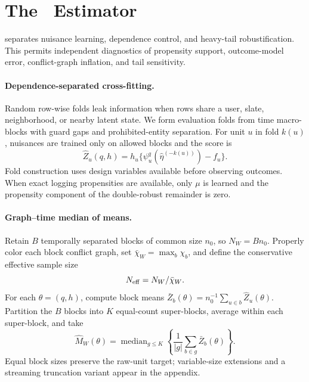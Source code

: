 \section{The \COMET\ Estimator}
\label{sec:method}

\COMET separates nuisance learning, dependence control, and heavy-tail robustification. This permits independent diagnostics of propensity support, outcome-model error, conflict-graph inflation, and tail sensitivity.

\paragraph{Dependence-separated cross-fitting.}
Random row-wise folds leak information when rows share a user, slate, neighborhood, or nearby latent state. We form evaluation folds from time macro-blocks with guard gaps and prohibited-entity separation. For unit $u$ in fold $k(u)$, nuisances are trained only on allowed blocks and the score is
\begin{equation}
\widehat Z_u(q,h)=h_u\{\psi_u^q(\widehat\eta^{(-k(u))})-f_u\}.
\label{eq:crossfit-score}
\end{equation}
Fold construction uses design variables available before observing outcomes. When exact logging propensities are available, only $\mu$ is learned and the propensity component of the double-robust remainder is zero.

\paragraph{Graph--time median of means.}
Retain $B$ temporally separated blocks of common size $n_0$, so $N_W=Bn_0$. Properly color each block conflict graph, set $\bar\chi_W=\max_b\chi_b$, and define the conservative effective sample size
\begin{equation}
N_{\mathrm{eff}}=N_W/\bar\chi_W.
\label{eq:neff}
\end{equation}
For each $\theta=(q,h)$, compute block means $\bar Z_b(\theta)=n_0^{-1}\sum_{u\in b}\widehat Z_u(\theta)$. Partition the $B$ blocks into $K$ equal-count super-blocks, average within each super-block, and take
\begin{equation}
\widehat M_W(\theta)=\operatorname{median}_{g\le K}
\left\{\frac1{|g|}\sum_{b\in g}\bar Z_b(\theta)\right\}.
\label{eq:comet-estimator}
\end{equation}
Equal block sizes preserve the raw-unit target; variable-size extensions and a streaming truncation variant appear in the appendix.

